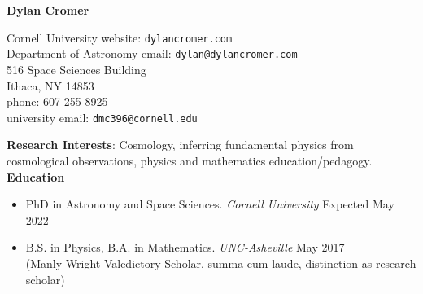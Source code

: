 \documentclass[a4paper, 11pt]{article}
\title{}
\author{}
\date{Last Edited: \today}
\newcommand{\myrule}{\hrulefill}
\newcommand{\noi}{\noindent}
\begin{document}
\begin{center} 
\textbf{Dylan Cromer} 
\\
\myrule
\end{center}

\noi Cornell University \hfill website: \texttt{dylancromer.com}
\\
Department of Astronomy \hfill email: \texttt{dylan@dylancromer.com}
\\
516 Space Sciences Building \hfill
\\
Ithaca, NY 14853 \hfill
\\
phone: 607-255-8925 \hfill
\\
university email: \texttt{dmc396@cornell.edu} \hfill
\\

\fancyfoot{\myrule \\ Dylan Cromer \hfill \thepage}

\noi \textbf{Research Interests}: Cosmology, inferring fundamental physics from cosmological observations, physics and mathematics education/pedagogy.
\\

\noi \textbf{Education}
\begin{itemize}[leftmargin=*]

	\item PhD in Astronomy and Space Sciences. \emph{Cornell University} \hfill Expected May 2022
	
	\item \noi B.S. in Physics, B.A. in Mathematics. \emph{UNC-Asheville} \hfill May 2017
		\\
	(Manly Wright Valedictory Scholar, summa cum laude, distinction as research scholar)

\end{itemize}
\end{document}
